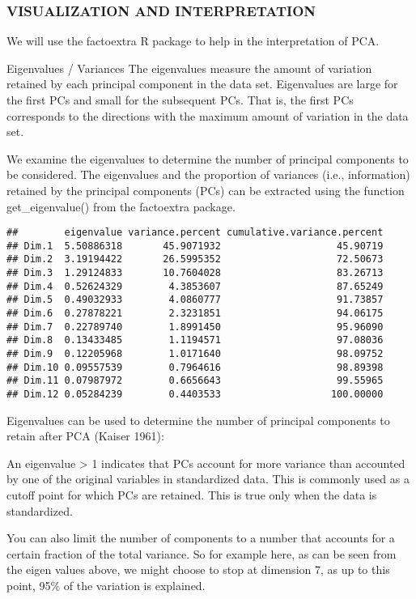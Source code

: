 \documentclass[]{article}
\begin{document}
\subsubsection{VISUALIZATION AND
INTERPRETATION}\label{visualization-and-interpretation}

We will use the factoextra R package to help in the interpretation of
PCA.

Eigenvalues / Variances The eigenvalues measure the amount of variation
retained by each principal component in the data set. Eigenvalues are
large for the first PCs and small for the subsequent PCs. That is, the
first PCs corresponds to the directions with the maximum amount of
variation in the data set.

We examine the eigenvalues to determine the number of principal
components to be considered. The eigenvalues and the proportion of
variances (i.e., information) retained by the principal components (PCs)
can be extracted using the function get\_eigenvalue() from the
factoextra package.

\begin{verbatim}
##        eigenvalue variance.percent cumulative.variance.percent
## Dim.1  5.50886318       45.9071932                    45.90719
## Dim.2  3.19194422       26.5995352                    72.50673
## Dim.3  1.29124833       10.7604028                    83.26713
## Dim.4  0.52624329        4.3853607                    87.65249
## Dim.5  0.49032933        4.0860777                    91.73857
## Dim.6  0.27878221        2.3231851                    94.06175
## Dim.7  0.22789740        1.8991450                    95.96090
## Dim.8  0.13433485        1.1194571                    97.08036
## Dim.9  0.12205968        1.0171640                    98.09752
## Dim.10 0.09557539        0.7964616                    98.89398
## Dim.11 0.07987972        0.6656643                    99.55965
## Dim.12 0.05284239        0.4403533                   100.00000
\end{verbatim}

Eigenvalues can be used to determine the number of principal components
to retain after PCA (Kaiser 1961):

An eigenvalue \textgreater{} 1 indicates that PCs account for more
variance than accounted by one of the original variables in standardized
data. This is commonly used as a cutoff point for which PCs are
retained. This is true only when the data is standardized.

You can also limit the number of components to a number that accounts
for a certain fraction of the total variance. So for example here, as
can be seen from the eigen values above, we might choose to stop at
dimension 7, as up to this point, 95\% of the variation is explained.
\end{document}
